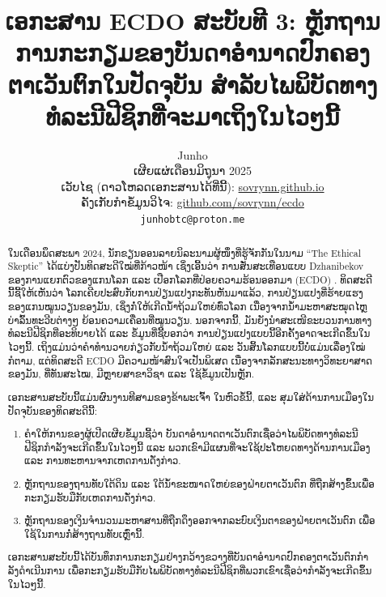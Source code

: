 \documentclass[10pt,twocolumn,letterpaper]{article}
\begin{document}
\title{ເອກະສານ ECDO ສະບັບທີ 3: ຫຼັກຖານການກະກຽມຂອງບັນດາອຳນາດປົກຄອງຕາເວັນຕົກໃນປັດຈຸບັນ ສໍາລັບໄພພິບັດທາງທໍລະນີຟີຊິກທີ່ຈະມາເຖິງໃນໄວໆນີ້}

\author{Junho\\
ເຜີຍແຜ່ເດືອນມິຖຸນາ 2025\\
ເວັບໄຊ (ດາວໂຫລດເອກະສານໄດ້ທີ່ນີ້): \href{https://sovrynn.github.io}{sovrynn.github.io}\\
ຄັງເກັບກຳຂໍ້ມູນວິໄຈ: \href{https://github.com/sovrynn/ecdo}{github.com/sovrynn/ecdo}\\
{\tt\small junhobtc@proton.me}
}

\maketitle

\begin{abstract}
ໃນເດືອນພຶດສະພາ 2024, ນັກຂຽນອອນລາຍນິລະນາມຜູ້ໜຶ່ງທີ່ຮູ້ຈັກກັນໃນນາມ “The Ethical Skeptic” \cite{0} ໄດ້ແບ່ງປັນທິດສະດີໃໝ່ທີ່ກ້າວໜ້າ ເຊິ່ງເອີ້ນວ່າ ການສັ່ນສະເທືອນແບບ Dzhanibekov ຂອງການແຍກຕົວຂອງແກນໂລກ ແລະ ເປືອກໂລກທີ່ປ່ອຍຄວາມຮ້ອນອອກມາ (ECDO) \cite{1}. ທິດສະດີນີ້ຊີ້ໃຫ້ເຫັນວ່າ ໂລກເຄີຍປະສົບກັບການປ່ຽນແປງກະທັນຫັນມາແລ້ວ, ການປ່ຽນແປງທີ່ຮ້າຍແຮງຂອງແກນໝູນວຽນຂອງມັນ, ເຊິ່ງກໍ່ໃຫ້ເກີດນໍ້າຖ້ວມໃຫຍ່ທົ່ວໂລກ ເນື່ອງຈາກນໍ້າມະຫາສະໝຸດໄຫຼບ່າລົ້ນທະວີບຕ່າງໆ ຍ້ອນຄວາມເຄື່ອນທີ່ໝູນວຽນ. ນອກຈາກນີ້, ມັນຍັງນຳສະເໜີຂະບວນການທາງທໍລະນີຟີຊິກທີ່ອະທິບາຍໄດ້ ແລະ ຂໍ້ມູນທີ່ຊີ້ບອກວ່າ ການປ່ຽນແປງແບບນີ້ອີກຄັ້ງອາດຈະເກີດຂຶ້ນໃນໄວໆນີ້. ເຖິງແມ່ນວ່າຄຳທຳນວາຍກ່ຽວກັບນໍ້າຖ້ວມໃຫຍ່ ແລະ ວັນສິ້ນໂລກແບບນີ້ບໍ່ແມ່ນເລື່ອງໃໝ່ກໍຕາມ, ແຕ່ທິດສະດີ ECDO ມີຄວາມໜ້າສົນໃຈເປັນພິເສດ ເນື່ອງຈາກລັກສະນະທາງວິທະຍາສາດຂອງມັນ, ທີ່ທັນສະໄໝ, ມີຫຼາຍສາຂາວິຊາ ແລະ ໃຊ້ຂໍ້ມູນເປັນຫຼັກ.

ເອກະສານສະບັບນີ້ແມ່ນຜົນງານທີສາມຂອງຂ້າພະເຈົ້າ \cite{2,3} ໃນຫົວຂໍ້ນີ້, ແລະ ສຸມໃສ່ດ້ານການເມືອງໃນປັດຈຸບັນຂອງທິດສະດີນີ້:
\begin{flushleft}
\begin{enumerate}
    \item ຄໍາໃຫ້ການຂອງຜູ້ເປີດເຜີຍຂໍ້ມູນຊີ້ວ່າ ບັນດາອໍານາດຕາເວັນຕົກເຊື່ອວ່າໄພພິບັດທາງທໍລະນີຟີຊິກກຳລັງຈະເກີດຂຶ້ນໃນໄວໆນີ້ ແລະ ພວກເຂົາມີແຜນທີ່ຈະໃຊ້ປະໂຫຍດທາງດ້ານການເມືອງ ແລະ ການທະຫານຈາກເຫດການດັ່ງກ່າວ.
    \item ຫຼັກຖານຂອງຖານທັບໃຕ້ດິນ ແລະ ໃຕ້ນໍ້າຂະໜາດໃຫຍ່ຂອງຝ່າຍຕາເວັນຕົກ ທີ່ຖືກສ້າງຂຶ້ນເພື່ອກະກຽມຮັບມືກັບເຫດການດັ່ງກ່າວ.
    \item ຫຼັກຖານຂອງເງິນຈໍານວນມະຫາສານທີ່ຖືກດຶງອອກຈາກລະບົບເງິນຕາຂອງຝ່າຍຕາເວັນຕົກ ເພື່ອໃຊ້ໃນການກໍ່ສ້າງຖານທັບເຫຼົ່ານີ້.
\end{enumerate}
\end{flushleft}

ເອກະສານສະບັບນີ້ໄດ້ບັນທຶກການກະກຽມຢ່າງກວ້າງຂວາງທີ່ບັນດາອຳນາດປົກຄອງຕາເວັນຕົກກຳລັງດໍາເນີນການ ເພື່ອກະກຽມຮັບມືກັບໄພພິບັດທາງທໍລະນີຟີຊິກທີ່ພວກເຂົາເຊື່ອວ່າກຳລັງຈະເກີດຂຶ້ນໃນໄວໆນີ້.
\end{abstract}
\end{document}

